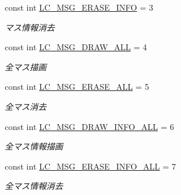 \begin{DoxyCompactItemize}
const int \hyperlink{class_reversi4color_wpf_1_1_reversi_const_a7dfae75b18ed51bc2be1a68921618657}{L\+C\+\_\+\+M\+S\+G\+\_\+\+E\+R\+A\+S\+E\+\_\+\+I\+N\+FO} = 3
\begin{DoxyCompactList}\small\item\em マス情報消去 \end{DoxyCompactList}\item 
\mbox{\label{class_reversi4color_wpf_1_1_reversi_const_a52f481512dfdf8eed1558575ff5a9506}} 
const int \hyperlink{class_reversi4color_wpf_1_1_reversi_const_a52f481512dfdf8eed1558575ff5a9506}{L\+C\+\_\+\+M\+S\+G\+\_\+\+D\+R\+A\+W\+\_\+\+A\+LL} = 4
\begin{DoxyCompactList}\small\item\em 全マス描画 \end{DoxyCompactList}\item 
\mbox{\label{class_reversi4color_wpf_1_1_reversi_const_ab82d0e56d080aa07695bb287b4453b97}} 
const int \hyperlink{class_reversi4color_wpf_1_1_reversi_const_ab82d0e56d080aa07695bb287b4453b97}{L\+C\+\_\+\+M\+S\+G\+\_\+\+E\+R\+A\+S\+E\+\_\+\+A\+LL} = 5
\begin{DoxyCompactList}\small\item\em 全マス消去 \end{DoxyCompactList}\item 
\mbox{\label{class_reversi4color_wpf_1_1_reversi_const_a533b82f5a4ed5f081df0ec2dc71b2be8}} 
const int \hyperlink{class_reversi4color_wpf_1_1_reversi_const_a533b82f5a4ed5f081df0ec2dc71b2be8}{L\+C\+\_\+\+M\+S\+G\+\_\+\+D\+R\+A\+W\+\_\+\+I\+N\+F\+O\+\_\+\+A\+LL} = 6
\begin{DoxyCompactList}\small\item\em 全マス情報描画 \end{DoxyCompactList}\item 
\mbox{\label{class_reversi4color_wpf_1_1_reversi_const_ad3c70abdd3f761b0dcc54e4a024c20b7}} 
const int \hyperlink{class_reversi4color_wpf_1_1_reversi_const_ad3c70abdd3f761b0dcc54e4a024c20b7}{L\+C\+\_\+\+M\+S\+G\+\_\+\+E\+R\+A\+S\+E\+\_\+\+I\+N\+F\+O\+\_\+\+A\+LL} = 7
\begin{DoxyCompactList}\small\item\em 全マス情報消去 \end{DoxyCompactList}\item 

\end{DoxyCompactItemize}
